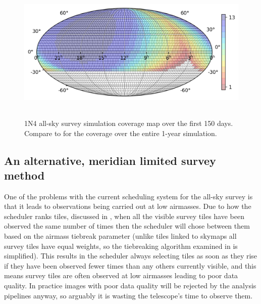 \begin{colsection}
\begin{colsection}
\begin{figure}[p]
    \begin{center}
        \includegraphics[height=190pt]{images/survey_sims/150_1N4_lite.png}
    \end{center}

    \caption[1N4 survey simulation observations over 150 days]{
        1N4 all-sky survey simulation coverage map over the first 150 days. Compare to  for the coverage over the entire 1-year simulation.
    }\label{fig:survey_sim_1n4_150}
\end{figure}

\clearpage

\end{colsection}


\subsection{An alternative, meridian limited survey method}
\label{sec:survey_sim_meridian}
\begin{colsection}

One of the problems with the current scheduling system for the all-sky survey is that it leads to observations being carried out at low airmasses. Due to how the scheduler ranks tiles, discussed in , when all the visible survey tiles have been observed the same number of times then the scheduler will chose between them based on the airmass tiebreak parameter (unlike tiles linked to skymaps all survey tiles have equal weights, so the tiebreaking algorithm examined in  is simplified). This results in the scheduler always selecting tiles as soon as they rise if they have been observed fewer times than any others currently visible, and this means survey tiles are often observed at low airmasses leading to poor data quality. In practice images with poor data quality will be rejected by the analysis pipelines anyway, so arguably it is wasting the telescope's time to observe them.


\end{colsection}
\end{colsection}
